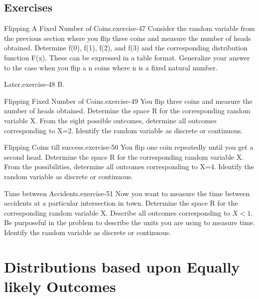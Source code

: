\documentclass[10pt,]{book}
\numberwithin{equation}{section}
\newcommand{\lt}{<}
\begin{document}
\section[{Exercises}]{Exercises}\label{section-38}
\begin{inlineexercise}{Flipping A Fixed Number of Coins.}{exercise-47}%
\hypertarget{p-761}{}%
Consider the random variable from the previous section where you flip three coins and measure the number of heads obtained. Determine f(0), f(1), f(2), and f(3) and the corresponding distribution function F(x). These can be expressed in a table format. Generalize your answer to the case when you flip a n coins where n is a fixed natural number.%
\end{inlineexercise}
\begin{inlineexercise}{Later.}{exercise-48}%
\hypertarget{p-762}{}%
B.%
\end{inlineexercise}
\begin{inlineexercise}{Flipping Fixed Number of Coins.}{exercise-49}%
\hypertarget{p-763}{}%
You flip three coins and measure the number of heads obtained. Determine the space R for the corresponding random variable X. From the eight possible outcomes, determine all outcomes corresponding to X=2. Identify the random variable as discrete or continuous.%
\end{inlineexercise}
\begin{inlineexercise}{Flipping Coins till success.}{exercise-50}%
\hypertarget{p-764}{}%
You flip one coin repeatedly until you get a second head. Determine the space R for the corresponding random variable X. From the possibilities, determine all outcomes corresponding to X=4. Identify the random variable as discrete or continuous.%
\end{inlineexercise}
\begin{inlineexercise}{Time between Accidents.}{exercise-51}%
\hypertarget{p-765}{}%
Now you want to measure the time between accidents at a particular intersection in town. Determine the space R for the corresponding random variable X. Describe all outcomes corresponding to \(X \lt 1\). Be purposeful in the problem to describe the units you are using to measure time. Identify the random variable as discrete or continuous.%
\end{inlineexercise}
%
%
\typeout{************************************************}
\typeout{************************************************}
%
\chapter[{Distributions based upon Equally likely Outcomes}]{Distributions based upon Equally likely Outcomes}\label{UniformHypergeometric}
%
%
\typeout{************************************************}
\typeout{************************************************}
%
\end{document}
